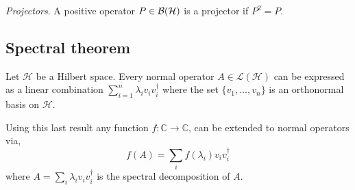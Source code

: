 \begin{definition}
  \emph{Projectors}. A positive operator $P \in \mathcal{B}(\mathcal{H})$ is a projector if $P^2 = P$.
\end{definition}





\subsection{Spectral theorem}

\begin{theorem}  \cite[Corollary 1.4]{watrous2018theory}
  Let $\mathcal{H}$ be a Hilbert space. Every normal operator $A \in \mathcal{L}(\mathcal{H})$ can be expressed as a linear combination $\sum_{i=1}^n \lambda_{i}v_{i}v_{i}^{\dag}$ where the set $\{v_{1}, \ldots , v_{n}\}$ is an orthonormal basis on $\mathcal{H}$.
\end{theorem}

Using this last result any function $f:\mathbb{C} \xrightarrow{} \mathbb{C}$, can be extended to normal operators via,
  \begin{equation} \label{eq:apply_f_diag} 
    f(A) = \sum_{i} f(\lambda_{i})v_{i}v_{i}^{\dag}
\end {equation}
where $A = \sum_{i} \lambda_{i}v_{i}v_{i}^{\dag}$ is the spectral decomposition of $A$.

